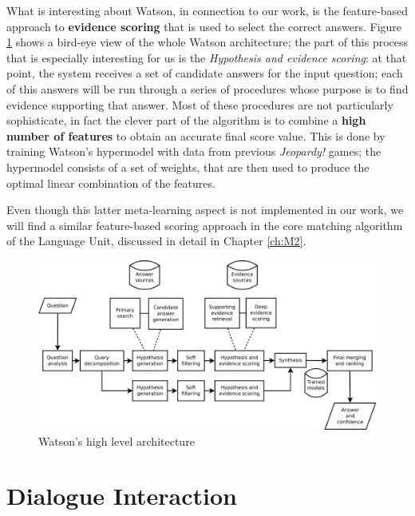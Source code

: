 What is interesting about Watson, in connection to our work, is the feature-based approach to \textbf{evidence scoring} that is used to select the correct answers. Figure \ref{ch:rw:ml:watson} \citep{journals/aim/FerrucciBCFGKLMNPSW10} shows a bird-eye view of the whole Watson architecture; the part of this process that is especially interesting for us is the \textit{Hypothesis and evidence scoring}: at that point, the system receives a set of candidate answers for the input question; each of this answers will be run through a series of procedures whose purpose is to find evidence supporting that answer. Most of these procedures are not particularly sophisticate, in fact the clever part of the algorithm is to combine a \textbf{high number of features} to obtain an accurate final score value. This is done by training Watson's hypermodel with data from previous \textit{Jeopardy!} games; the hypermodel consists of a set of weights, that are then used to produce the optimal linear combination of the features.

Even though this latter meta-learning aspect is not implemented in our work, we will find a similar feature-based scoring approach in the core matching algorithm of the Language Unit, discussed in detail in Chapter \ref{ch:M2}.

\begin{figure}
	\centering
	\includegraphics[width=12cm]{Pictures/DeepQA.pdf}
	\caption{Watson's high level architecture}
	\label{ch:rw:ml:watson}
\end{figure}




\section{Dialogue Interaction} \label{ch:rw:isu}

